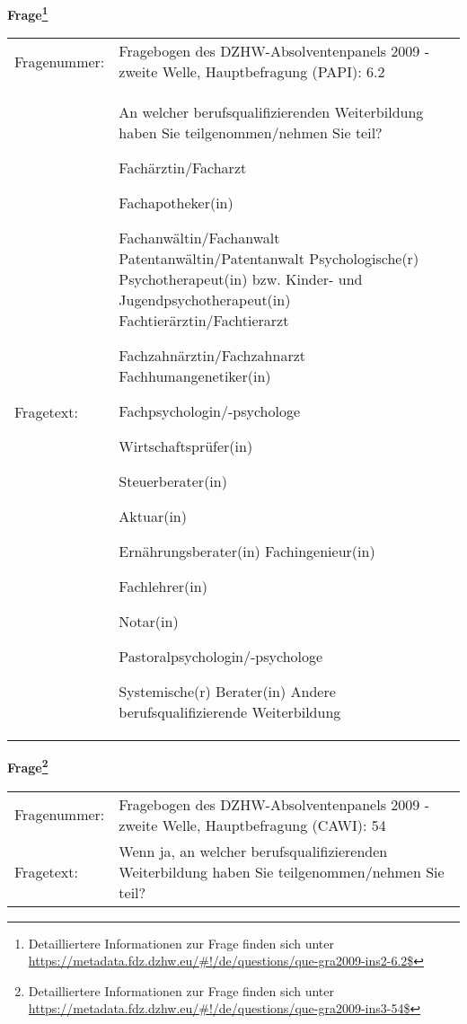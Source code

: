 				\vspace*{0.5cm}
                \noindent\textbf{Frage\footnote{Detailliertere Informationen zur Frage finden sich unter
		              \url{https://metadata.fdz.dzhw.eu/\#!/de/questions/que-gra2009-ins2-6.2$}}}\\
				\begin{tabularx}{\hsize}{@{}lX}
					Fragenummer: &
					  Fragebogen des DZHW-Absolventenpanels 2009 - zweite Welle, Hauptbefragung (PAPI):
					  6.2
 \\
					Fragetext: & An welcher berufsqualifizierenden Weiterbildung haben Sie teilgenommen/nehmen Sie teil?\par  Fachärztin/Facharzt\par  Fachapotheker(in)\par  Fachanwältin/Fachanwalt Patentanwältin/Patentanwalt Psychologische(r) Psychotherapeut(in) bzw. Kinder- und Jugendpsychotherapeut(in) Fachtierärztin/Fachtierarzt\par  Fachzahnärztin/Fachzahnarzt Fachhumangenetiker(in)\par  Fachpsychologin/-psychologe\par  Wirtschaftsprüfer(in)\par  Steuerberater(in)\par  Aktuar(in)\par  Ernährungsberater(in) Fachingenieur(in)\par  Fachlehrer(in)\par  Notar(in)\par  Pastoralpsychologin/-psychologe\par  Systemische(r) Berater(in) Andere berufsqualifizierende Weiterbildung \\
				\end{tabularx}
				\vspace*{0.5cm}
                \noindent\textbf{Frage\footnote{Detailliertere Informationen zur Frage finden sich unter
		              \url{https://metadata.fdz.dzhw.eu/\#!/de/questions/que-gra2009-ins3-54$}}}\\
				\begin{tabularx}{\hsize}{@{}lX}
					Fragenummer: &
					  Fragebogen des DZHW-Absolventenpanels 2009 - zweite Welle, Hauptbefragung (CAWI):
					  54
 \\
					Fragetext: & Wenn ja, an welcher berufsqualifizierenden Weiterbildung haben Sie teilgenommen/nehmen Sie teil? \\
				\end{tabularx}





